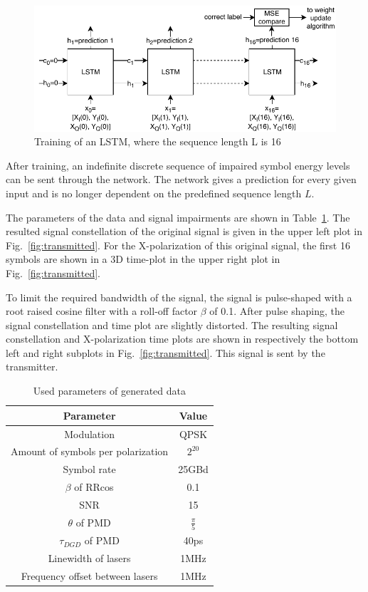\documentclass[journal,10pt,twoside, a4paper]{IEEEtran}
\begin{document}
\begin{figure}
    \centering
    \includegraphics[width=0.9\linewidth]{Thesis/images/lstm_training.pdf}
    \caption{Training of an LSTM, where the sequence length L is 16}
    \label{fig:lstm_training}
\end{figure}

After training, an indefinite discrete sequence of impaired symbol energy levels can be sent through the network. The network gives a prediction for every given input and is no longer dependent on the predefined sequence length $L$.

The parameters of the data and signal impairments are shown in Table~\ref{tab:parameters}. The resulted signal constellation of the original signal is given in the upper left plot in Fig.~\ref{fig:transmitted}. For the X-polarization of this original signal, the first 16 symbols are shown in a 3D time-plot in the upper right plot in Fig.~\ref{fig:transmitted}.

To limit the required bandwidth of the signal, the signal is pulse-shaped with a root raised cosine filter with a roll-off factor $\beta$ of 0.1. After pulse shaping, the signal constellation and time plot are slightly distorted. The resulting signal constellation and X-polarization time plots are shown in respectively the bottom left and right subplots in Fig.~\ref{fig:transmitted}. This signal is sent by the transmitter.

\begin{table}
    \centering
    \caption{Used parameters of generated data}
    \label{tab:parameters}
    \begin{tabular}{c|c}
        Parameter & Value\\
        \hline
        Modulation & QPSK\\
        Amount of symbols per polarization & $2^{20}$\\
        Symbol rate & 25GBd\\
        $\beta$ of RRcos & 0.1\\
        SNR & 15\\
        $\theta$ of PMD & $\frac{\pi}{5}$\\
        $\tau_{DGD}$ of PMD & 40ps\\
        Linewidth of lasers & 1MHz\\
        Frequency offset between lasers & 1MHz\\
    \end{tabular}
\end{table}
\end{document}
